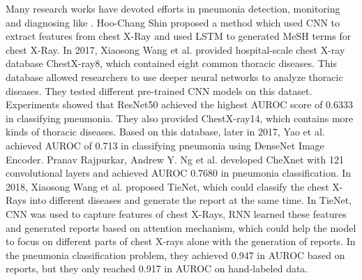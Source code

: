 \documentclass[journal]{IEEEtran}
\begin{document}
Many research works have devoted efforts in pneumonia detection, monitoring and diagnosing like \cite{Shin2016Learning, deepika2018classification, iakovidis2012image}.
Hoo-Chang Shin \cite{Shin2016Learning} proposed a method which used CNN to extract features from chest X-Ray and used LSTM \cite{hochreiter1997long} to generated MeSH \cite{timmurphy.org} terms for chest X-Ray. In 2017, Xiaosong Wang et al. \cite{Wang2017ChestX} provided hospital-scale chest X-ray database ChestX-ray8, which contained eight common thoracic diseases. This database allowed researchers to use deeper neural networks to analyze thoracic diseases. They tested different pre-trained CNN models on this dataset. Experiments showed that ResNet50 achieved the highest AUROC score of 0.6333 in classifying pneumonia. They also provided ChestX-ray14, which contains more kinds of thoracic diseases.
Based on this database, later in 2017, Yao et al. \cite{yao2017learning} achieved AUROC of 0.713 in classifying pneumonia using DenseNet Image Encoder. Pranav Rajpurkar, Andrew Y. Ng et al. \cite{Rajpurkar2017CheXNet} developed CheXnet with 121 convolutional layers and achieved AUROC 0.7680 in pneumonia classification.
In 2018, Xiaosong Wang et al. \cite{Wang2018TieNet} proposed TieNet, which could classify the chest X-Rays into different diseases and generate the report at the same time. In TieNet, CNN was used to capture features of chest X-Rays, RNN learned these features and generated reports based on attention mechanism, which could help the model to focus on different parts of chest X-rays alone with the generation of reports. In the pneumonia classification problem, they achieved 0.947 in AUROC based on reports, but they only reached 0.917 in AUROC on hand-labeled data. 
\end{document}
